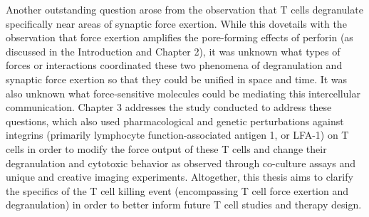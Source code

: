 Another outstanding question arose from the observation that T cells degranulate specifically near areas of synaptic force exertion. While this dovetails with the observation that force exertion amplifies the pore-forming effects of perforin (as discussed in the Introduction and Chapter 2), it was unknown what types of forces or interactions coordinated these two phenomena of degranulation and synaptic force exertion so that they could be unified in space and time. It was also unknown what force-sensitive molecules could be mediating this intercellular communication. Chapter 3 addresses the study conducted to address these questions, which also used pharmacological and genetic perturbations against integrins (primarily lymphocyte function-associated antigen 1, or LFA-1) on T cells in order to modify the force output of these T cells and change their degranulation and cytotoxic behavior as observed through co-culture assays and unique and creative imaging experiments. Altogether, this thesis aims to clarify the specifics of the T cell killing event (encompassing T cell force exertion and degranulation) in order to better inform future T cell studies and therapy design.
